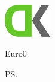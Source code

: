 \documentclass[a4paper]{scrlttr2}
\begin{document}
	\begin{letter}{\customerCompany \\ \customerName \\ 
	\customerStreet \\ \customerZIP \ \customerCity}
	
			\includegraphics[width=0.15\textwidth]{logo.png}			
			\opening{\invoiceSalutation}
			\invoiceText
		    \begin{invoice}{Euro}{0}
			    
		    \end{invoice}
		\ps \invoiceHint
		
		\renewcommand*{\raggedsignature}{\raggedright} 
		\closing{\invoiceClosing}
		\invoiceEnclosures



	\end{letter}
\end{document}
